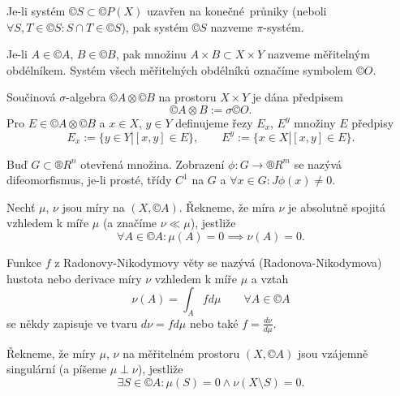\documentclass[12pt]{article}					%
\begin{document}
\begin{definice}[$\pi$-systém]
	Je-li systém $©S \subset ©P(X)$ uzavřen na konečné průniky (neboli $\forall S, T \in ©S: S \cap T \in ©S$), pak systém $©S$ nazveme $\pi$-systém.
\end{definice}


\begin{definice}
	Je-li $A \in ©A$, $B \in ©B$, pak množinu $A \times B \subset X \times Y$ nazveme měřitelným obdélníkem. Systém všech měřitelných obdélníků označíme symbolem $©O$.

	Součinová $\sigma$-algebra $©A \otimes ©B$ na prostoru $X \times Y$ je dána předpisem
	$$ ©A \otimes B := \sigma ©O. $$
	Pro $E \in ©A \otimes ©B$ a $x \in X$, $y \in Y$ definujeme řezy $E_x$, $E^y$ množiny $E$ předpisy
	$$ E_x := \{y \in Y | [x, y] \in E\}, \qquad E^y := \{x \in X | [x, y] \in E\}. $$
\end{definice}



\begin{definice}[$C^1$-difeomorfismus]
	Buď $G \subset ®R^n$ otevřená množina. Zobrazení $\phi: G \rightarrow ®R^m$ se nazývá difeomorfismus, je-li prosté, třídy $C^1$ na $G$ a $\forall x \in G: J \phi(x) ≠ 0$.
\end{definice}



\begin{definice}
	Nechť $\mu$, $\nu$ jsou míry na $(X, ©A)$. Řekneme, že míra $\nu$ je absolutně spojitá vzhledem k míře $\mu$ (a značíme $\nu \ll \mu$), jestliže
	$$ \forall A \in ©A: \mu(A) = 0 \implies \nu(A) = 0. $$
\end{definice}

\begin{definice}
	Funkce $f$ z Radonovy-Nikodymovy věty se nazývá (Radonova-Nikodymova) hustota nebo derivace míry $\nu$ vzhledem k míře $\mu$ a vztah
	$$ \nu(A) = \int_A f d\mu \qquad \forall A \in ©A $$
	se někdy zapisuje ve tvaru $d\nu = f d\mu$ nebo také $f = \frac{d\nu}{d\mu}$.
\end{definice}


\begin{definice}
	Řekneme, že míry $\mu$, $\nu$ na měřitelném prostoru $(X, ©A)$ jsou vzájemně singulární (a píšeme $\mu \perp \nu$), jestliže
	$$ \exists S \in ©A: \mu(S) = 0 \land \nu(X \setminus S) = 0. $$
\end{definice}
\end{document}
